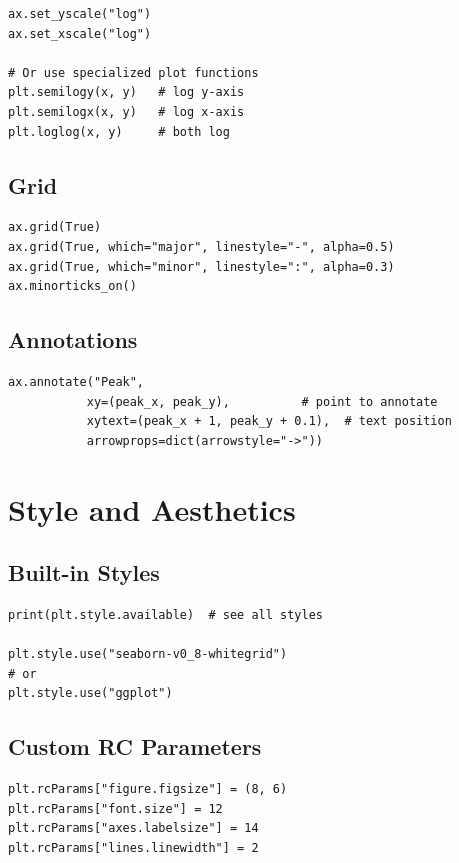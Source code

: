 \begin{lstlisting}
ax.set_yscale("log")
ax.set_xscale("log")

# Or use specialized plot functions
plt.semilogy(x, y)   # log y-axis
plt.semilogx(x, y)   # log x-axis
plt.loglog(x, y)     # both log
\end{lstlisting}

\subsection{Grid}

\begin{lstlisting}
ax.grid(True)
ax.grid(True, which="major", linestyle="-", alpha=0.5)
ax.grid(True, which="minor", linestyle=":", alpha=0.3)
ax.minorticks_on()
\end{lstlisting}

\subsection{Annotations}

\begin{lstlisting}
ax.annotate("Peak",
           xy=(peak_x, peak_y),          # point to annotate
           xytext=(peak_x + 1, peak_y + 0.1),  # text position
           arrowprops=dict(arrowstyle="->"))
\end{lstlisting}

\section{Style and Aesthetics}
\label{sec:style}

\subsection{Built-in Styles}

\begin{lstlisting}
print(plt.style.available)  # see all styles

plt.style.use("seaborn-v0_8-whitegrid")
# or
plt.style.use("ggplot")
\end{lstlisting}

\subsection{Custom RC Parameters}

\begin{lstlisting}
plt.rcParams["figure.figsize"] = (8, 6)
plt.rcParams["font.size"] = 12
plt.rcParams["axes.labelsize"] = 14
plt.rcParams["lines.linewidth"] = 2
\end{lstlisting}

